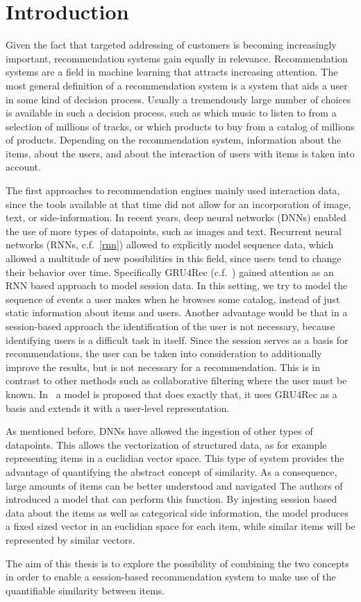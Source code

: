 \chapter{Introduction}
Given the fact that targeted addressing of customers is becoming increasingly important, recommendation systems gain equally in relevance.
Recommendation systems are a field in machine learning that attracts increasing attention.
The most general definition of a recommendation system is a system that aids a user in some kind of decision process.
Usually a tremendously large number of choices is available in such a decision process, such as which music to listen to from a selection of millions of tracks, or which products to buy from a catalog of millions of products.
Depending on the recommendation system, information about the items, about the users, and about the interaction of users with items is taken into account.
\par
The first approaches to recommendation engines mainly used interaction data, since the tools available at that time did not allow for an incorporation of image, text, or side-information.
In recent years, deep neural networks (DNNs) enabled the use of more types of datapoints, such as images and text.
Recurrent neural networks (RNNs, c.f.~\ref{rnn}) allowed to explicitly model sequence data, which allowed a multitude of new possibilities in this field, since users tend to change their behavior over time.
Specifically GRU4Rec (c.f.~\cite{gru4rec}) gained attention as an RNN based approach to model session data.
In this setting, we try to model the sequence of events a user makes when he browses some catalog, instead of just static information about items and users.
Another advantage would be that in a session-based approach the identification of the user is not necessary, because identifying users is a difficult task in itself.
Since the session serves as a basis for recommendations, the user can be taken into consideration to additionally improve the results, but is not necessary for a recommendation.
This is in contrast to other methods such as collaborative filtering where the user must be known.
In~\cite{hierarchical} a model is proposed that does exactly that, it uses GRU4Rec as a basis and extends it with a user-level representation.
\par
As mentioned before, DNNs have allowed the ingestion of other types of datapoints.
This allows the vectorization of structured data, as for example representing items in a euclidian vector space.
This type of system provides the advantage of quantifying the abstract concept of similarity.
As a consequence, large amounts of items can be better understood and navigated
The authors of~\cite{meta_prod2vec} introduced a model that can perform this function.
By injesting session based data about the items as well as categorical side information, the model produces a fixed sized vector in an euclidian space for each item, while similar items will be represented by similar vectors.
\par
The aim of this thesis is to explore the possibility of combining the two concepts in order to enable a session-based recommendation system to make use of the quantifiable similarity between items.